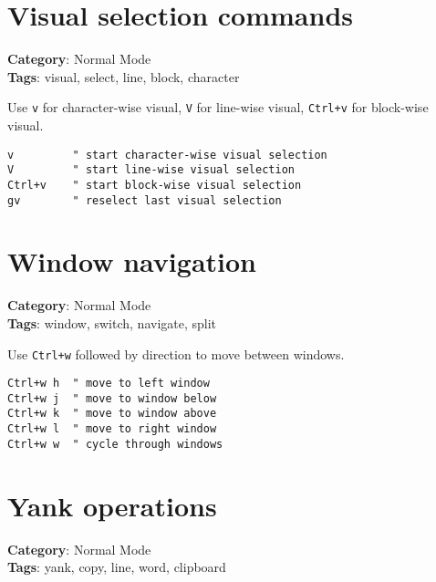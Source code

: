 {{{{{{{{{{\section{Visual selection commands}

\textbf{Category}: Normal Mode\\ \textbf{Tags}: visual, select, line, block, character
\vspace{0.5cm}

Use {\footnotesize \Verb§v§} for character-wise visual, {\footnotesize \Verb§V§} for line-wise visual, {\footnotesize \Verb§Ctrl+v§} for block-wise visual.

\begin{Exa*}{}
\begin{Verbatim}[fontsize=\footnotesize, breaklines, breakanywhere]
v         " start character-wise visual selection
V         " start line-wise visual selection
Ctrl+v    " start block-wise visual selection
gv        " reselect last visual selection
\end{Verbatim}
\end{Exa*}

\section{Window navigation}

\textbf{Category}: Normal Mode\\ \textbf{Tags}: window, switch, navigate, split
\vspace{0.5cm}

Use {\footnotesize \Verb§Ctrl+w§} followed by direction to move between windows.

\begin{Exa*}{}
\begin{Verbatim}[fontsize=\footnotesize, breaklines, breakanywhere]
Ctrl+w h  " move to left window
Ctrl+w j  " move to window below
Ctrl+w k  " move to window above
Ctrl+w l  " move to right window
Ctrl+w w  " cycle through windows
\end{Verbatim}
\end{Exa*}

\section{Yank operations}

\textbf{Category}: Normal Mode\\ \textbf{Tags}: yank, copy, line, word, clipboard
\vspace{0.5cm}

}}}}}}}}}}

